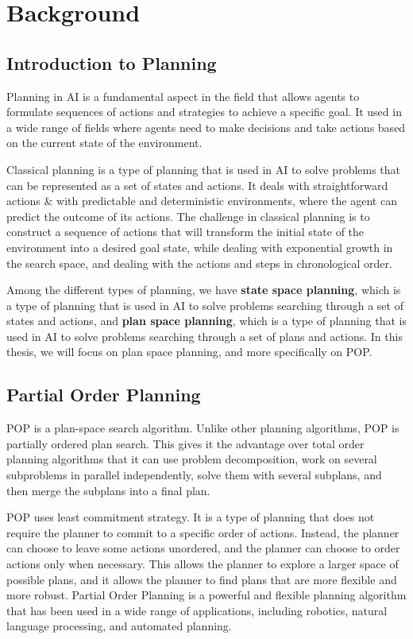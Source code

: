 \chapter{Background}\label{chap:background}

\section{Introduction to Planning}
Planning in \acs{AI} is a fundamental aspect in the field that allows agents to formulate sequences of actions and strategies
to achieve a specific goal. It used in a wide range of fields where agents need to make decisions and take actions based on the
current state of the environment.

Classical planning is a type of planning that is used in \acs{AI} to solve problems that can be represented as a set of states and actions.
It deals with straightforward actions \& with predictable and deterministic environments, where the agent can predict the outcome of its actions.
The challenge in classical planning is to construct a sequence of actions that will transform the initial state
of the environment into a desired goal state, while dealing with exponential growth in the search space, and dealing with the
actions and steps in chronological order.

Among the different types of planning, we have \textbf{state space planning}, which is a type of planning that is used in \acs{AI} to solve
problems searching through a set of states and actions,
and \textbf{plan space planning}, which is a type of planning that is used in \acs{AI} to solve problems searching
through a set of plans and actions. In this thesis, we will focus on plan space planning, and more specifically on \acf{POP}.


\section{Partial Order Planning}
\acf{POP} is a plan-space search algorithm. Unlike other planning algorithms, \ac{POP} is partially ordered plan search.
This gives it the advantage over total order planning algorithms that it can use problem decomposition, work
on several subproblems in parallel independently, solve them with several subplans, and then merge the subplans into a final plan.


\ac{POP} uses least commitment strategy. It is a type of planning that does not require the planner to commit to a specific order of actions.
Instead, the planner can choose to leave some actions unordered, and the planner can choose to order actions only when necessary.
This allows the planner to explore a larger space of possible plans, and it allows the planner to find plans that
are more flexible and more robust. Partial Order Planning is a powerful and flexible planning algorithm that has
been used in a wide range of applications, including robotics, natural language processing, and automated planning.


